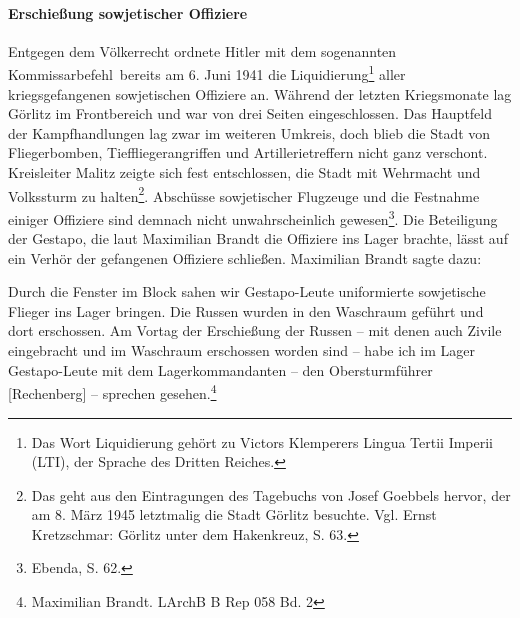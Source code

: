 \paragraph{Erschießung sowjetischer Offiziere}
Entgegen dem Völkerrecht ordnete Hitler mit dem sogenannten \glqq Kommissarbefehl\grqq~bereits am 6. Juni 1941 die \glqq Liquidierung\grqq\footnote{Das Wort Liquidierung gehört zu Victors Klemperers Lingua Tertii Imperii (LTI), der Sprache des Dritten Reiches.} aller kriegsgefangenen sowjetischen Offiziere an. Während der letzten Kriegsmonate lag Görlitz im Frontbereich und war von drei Seiten eingeschlossen. Das Hauptfeld der Kampfhandlungen lag zwar im weiteren Umkreis, doch blieb die Stadt von Fliegerbomben, Tieffliegerangriffen und Artillerietreffern nicht ganz verschont. Kreisleiter Malitz zeigte sich fest entschlossen, die Stadt mit Wehrmacht und Volkssturm zu halten\footnote{Das geht aus den Eintragungen des Tagebuchs von Josef Goebbels hervor, der am 8. März 1945 letztmalig die Stadt Görlitz besuchte. Vgl. Ernst Kretzschmar: Görlitz unter dem Hakenkreuz, S. 63.}. Abschüsse sowjetischer Flugzeuge und die Festnahme einiger Offiziere sind demnach nicht unwahrscheinlich gewesen\footnote{Ebenda, S. 62.}. Die Beteiligung der Gestapo, die laut Maximilian Brandt die Offiziere ins Lager brachte, lässt auf ein Verhör der gefangenen Offiziere schließen. Maximilian Brandt sagte dazu:
\begin{leftbar}
Durch die Fenster im Block sahen wir Gestapo-Leute uniformierte sowjetische Flieger ins Lager bringen. Die Russen wurden in den Waschraum geführt und dort erschossen. Am Vortag der Erschießung der Russen -- mit denen auch Zivile eingebracht und im Waschraum erschossen worden sind -- habe ich im Lager Gestapo-Leute mit dem Lagerkommandanten -- den Obersturmführer [Rechenberg] -- sprechen gesehen.\footnote{Maximilian Brandt. LArchB B Rep 058 Bd. 2}
\end{leftbar}

